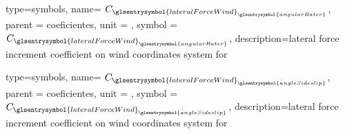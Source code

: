 {type=symbols,
    name= \ensuremath{C_{{\glsentrysymbol{lateralForceWind}}_{\glsentrysymbol{angularRater}}}},
    parent = {coeficientes},
    unit = \unexpanded{},
    symbol = \ensuremath{C_{{\glsentrysymbol{lateralForceWind}}_{\glsentrysymbol{angularRater}}}},
    description={lateral force increment coefficient on wind coordinates system  for }
}


{type=symbols,
    name= \ensuremath{C_{{\glsentrysymbol{lateralForceWind}}_{\dot{\glsentrysymbol{angleSideslip}}}}},
    parent = {coeficientes},
    unit = \unexpanded{},
    symbol = \ensuremath{C_{{\glsentrysymbol{lateralForceWind}}_{\dot{\glsentrysymbol{angleSideslip}}}}},
    description={lateral force increment coefficient on wind coordinates system  for }
}
